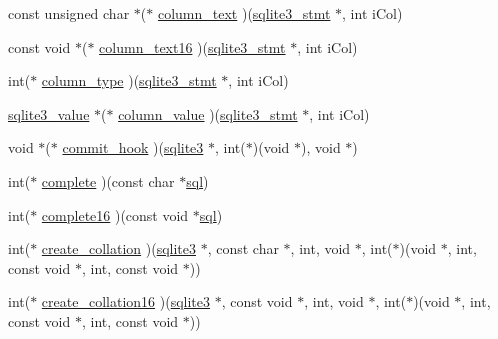 \begin{DoxyCompactItemize}
\item 
const unsigned char $\ast$($\ast$ \hyperlink{structsqlite3__api__routines_ae9bb95b6e37236693ca5ec51598c7908}{column\+\_\+text} )(\hyperlink{sqlite3_8h_af2a033da1327cdd77f0a174a09aedd0c}{sqlite3\+\_\+stmt} $\ast$, int i\+Col)
\item 
const void $\ast$($\ast$ \hyperlink{structsqlite3__api__routines_a952f4680bde7ff3af3ada148380ec08e}{column\+\_\+text16} )(\hyperlink{sqlite3_8h_af2a033da1327cdd77f0a174a09aedd0c}{sqlite3\+\_\+stmt} $\ast$, int i\+Col)
\item 
int($\ast$ \hyperlink{structsqlite3__api__routines_a1381e48828398ae738aa2416d2e4feb9}{column\+\_\+type} )(\hyperlink{sqlite3_8h_af2a033da1327cdd77f0a174a09aedd0c}{sqlite3\+\_\+stmt} $\ast$, int i\+Col)
\item 
\hyperlink{sqlite3_8h_ac2fa1ecdb2290d9af6010edbd1cbc83c}{sqlite3\+\_\+value} $\ast$($\ast$ \hyperlink{structsqlite3__api__routines_a1ca935310e3637179f857791ccb42116}{column\+\_\+value} )(\hyperlink{sqlite3_8h_af2a033da1327cdd77f0a174a09aedd0c}{sqlite3\+\_\+stmt} $\ast$, int i\+Col)
\item 
void $\ast$($\ast$ \hyperlink{structsqlite3__api__routines_a906bf080c41a7b3379866e08fe9f3db8}{commit\+\_\+hook} )(\hyperlink{sqlite3_8h_a0ef6f2646262c8a9b24368d8ac140f69}{sqlite3} $\ast$, int($\ast$)(void $\ast$), void $\ast$)
\item 
int($\ast$ \hyperlink{structsqlite3__api__routines_acf6be6ede31fda32f4f0193aafce0ba3}{complete} )(const char $\ast$\hyperlink{structsqlite3__api__routines_a0d4c8662baae0bd626f0ee334183e69e}{sql})
\item 
int($\ast$ \hyperlink{structsqlite3__api__routines_a12b69b88bc84fba6fe97cefa4b979eff}{complete16} )(const void $\ast$\hyperlink{structsqlite3__api__routines_a0d4c8662baae0bd626f0ee334183e69e}{sql})
\item 
int($\ast$ \hyperlink{structsqlite3__api__routines_a923433105b84b919ea359ef320da55b1}{create\+\_\+collation} )(\hyperlink{sqlite3_8h_a0ef6f2646262c8a9b24368d8ac140f69}{sqlite3} $\ast$, const char $\ast$, int, void $\ast$, int($\ast$)(void $\ast$, int, const void $\ast$, int, const void $\ast$))
\item 
int($\ast$ \hyperlink{structsqlite3__api__routines_ab3fe60d5c018e3ffcad08bec34dc53e7}{create\+\_\+collation16} )(\hyperlink{sqlite3_8h_a0ef6f2646262c8a9b24368d8ac140f69}{sqlite3} $\ast$, const void $\ast$, int, void $\ast$, int($\ast$)(void $\ast$, int, const void $\ast$, int, const void $\ast$))
\item 

\end{DoxyCompactItemize}

